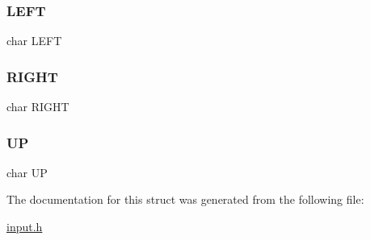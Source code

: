\mbox{\label{structinputs_abf3a99e39f90b8c0b0adb499e8be44cb}} 
\subsubsection{\texorpdfstring{LEFT}{LEFT}}
{\footnotesize\ttfamily char L\+E\+FT}

\mbox{\label{structinputs_ab56909fbd462ae4fa285e24388efcf9a}} 
\subsubsection{\texorpdfstring{RIGHT}{RIGHT}}
{\footnotesize\ttfamily char R\+I\+G\+HT}

\mbox{\label{structinputs_acf487aade419fe84132d0b08da4636b8}} 
\subsubsection{\texorpdfstring{UP}{UP}}
{\footnotesize\ttfamily char UP}



The documentation for this struct was generated from the following file\+:\begin{DoxyCompactItemize}
\item 
\mbox{\hyperlink{input_8h}{input.\+h}}\end{DoxyCompactItemize}
